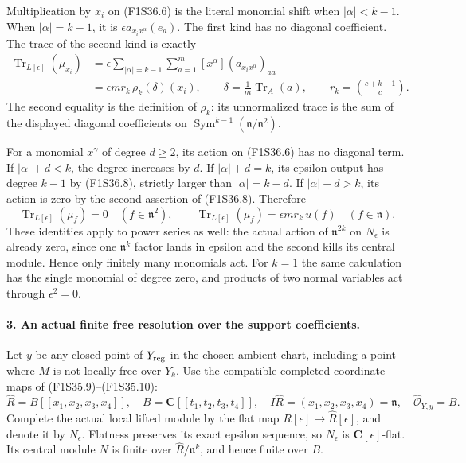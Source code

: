 Multiplication by $x_i$ on (F1S36.6) is the
literal monomial shift when $|\alpha|<k-1$.
When $|\alpha|=k-1$, it is
$\epsilon a_{x_i x^\alpha}(e_a)$.
The first kind has no diagonal coefficient.
The trace of the second kind is exactly
\[
\begin{split}
 \operatorname{Tr}_{L[\epsilon]}(\mu_{x_i})
 &=\epsilon\sum_{|\alpha|=k-1}\sum_{a=1}^m
       [x^\alpha](a_{x_i x^\alpha})_{aa}\\
 &=\epsilon m r_k\,\rho_k(\delta)(x_i),
 \qquad
 \delta=\frac1m\operatorname{Tr}_A(a),
 \qquad r_k=\binom{c+k-1}{c}.
\end{split}
 \tag{F1S36.9}
\]
The second equality is the definition of
$\rho_k$: its unnormalized trace is the sum
of the displayed diagonal coefficients on
$\operatorname{Sym}^{k-1}(\mathfrak n/\mathfrak n^2)$.

For a monomial $x^\gamma$ of degree $d\ge2$,
its action on (F1S36.6) has no diagonal term.
If $|\alpha|+d<k$, the degree increases by $d$.
If $|\alpha|+d=k$, its epsilon output has degree
$k-1$ by (F1S36.8), strictly larger than
$|\alpha|=k-d$.
If $|\alpha|+d>k$, its action is zero by the
second assertion of (F1S36.8).
Therefore
\[
 \operatorname{Tr}_{L[\epsilon]}(\mu_f)=0
       \quad(f\in\mathfrak n^2),
 \qquad
 \operatorname{Tr}_{L[\epsilon]}(\mu_f)
       =\epsilon m r_k\,u(f)
       \quad(f\in\mathfrak n).
 \tag{F1S36.10}
\]
These identities apply to power series as well:
the actual action of $\mathfrak n^{2k}$ on
$N_\epsilon$ is already zero, since one
$\mathfrak n^k$ factor lands in epsilon and
the second kills its central module.
Hence only finitely many monomials act.
For $k=1$ the same calculation has the single
monomial of degree zero, and products of two
normal variables act through $\epsilon^2=0$.

\paragraph{3. An actual finite free resolution over the support coefficients.}
Let $y$ be any closed point of $Y_{\rm reg}$
in the chosen ambient chart, including a point
where $M$ is not locally free over $Y_k$.
Use the compatible completed-coordinate maps
of (F1S35.9)--(F1S35.10):
\[
 \widehat R=B[[x_1,x_2,x_3,x_4]],\quad
 B=\mathbf C[[t_1,t_2,t_3,t_4]],\quad
 I\widehat R=(x_1,x_2,x_3,x_4)=\mathfrak n,
 \quad \widehat{\mathcal O}_{Y,y}=B.
 \tag{F1S36.11}
\]
Complete the actual local lifted module by the
flat map $R[\epsilon]\to\widehat R[\epsilon]$,
and denote it by $N_\epsilon$.
Flatness preserves its exact epsilon sequence,
so $N_\epsilon$ is $\mathbf C[\epsilon]$-flat.
Its central module $N$ is finite over
$\widehat R/\mathfrak n^k$, and hence finite
over $B$.

